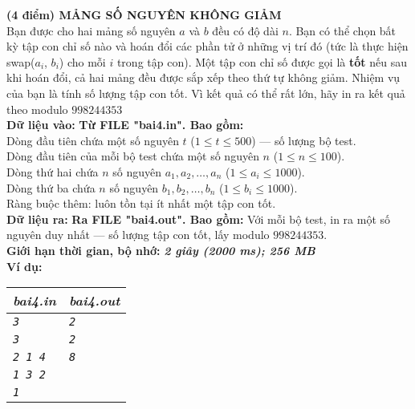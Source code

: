 \begin{ex}
	\textbf{(4 điểm) MẢNG SỐ NGUYÊN KHÔNG GIẢM}\\
	Bạn được cho hai mảng số nguyên $a$ và $b$ đều có độ dài $n$. Bạn có thể chọn bất kỳ tập con chỉ số nào và hoán đổi các phần tử ở những vị trí đó (tức là thực hiện swap($a_i$, $b_i$) cho mỗi $i$ trong tập con). Một tập con chỉ số được gọi là \textbf{tốt} nếu sau khi hoán đổi, cả hai mảng đều được sắp xếp theo thứ tự không giảm. Nhiệm vụ của bạn là tính số lượng tập con tốt. Vì kết quả có thể rất lớn, hãy in ra kết quả theo modulo $998244353$\\
	\textbf{Dữ liệu vào: } \textbf{Từ FILE "bai4.in". Bao gồm: }\\
	Dòng đầu tiên chứa một số nguyên $t$ ($1 \le t \le 500$) — số lượng bộ test. \\
	Dòng đầu tiên của mỗi bộ test chứa một số nguyên $n$ ($1 \le n \le 100$).\\
	Dòng thứ hai chứa $n$ số nguyên $a_1, a_2, \dots, a_n$ ($1 \le a_i \le 1000$). \\
	Dòng thứ ba chứa $n$ số nguyên $b_1, b_2, \dots, b_n$ ($1 \le b_i \le 1000$).\\
	Ràng buộc thêm: luôn tồn tại ít nhất một tập con tốt.\\
	\textbf{Dữ liệu ra: } \textbf{Ra FILE "bai4.out". Bao gồm: } Với mỗi bộ test, in ra một số nguyên duy nhất — số lượng tập con tốt, lấy modulo $998244353$. \\
	\textbf{Giới hạn thời gian, bộ nhớ: } \textbf{\textit{2 giây (2000 ms); 256 MB}} \\
	\textbf{Ví dụ: }
	\begin{center}
		\begin{tabular}{|l|l|}
			\hline
			\textbf{\textsf{\textit{bai4.in}}} & \textbf{\textsf{\textit{bai4.out}}} \\ %
			\hline
			\textit{\texttt{3}}                & \textit{\texttt{2}}                 \\ %
			\textit{\texttt{3}}                & \textit{\texttt{2}}                 \\ %
			\textit{\texttt{2 1 4}}            & \textit{\texttt{8}}                 \\ %
			\textit{\texttt{1 3 2}}            &                                     \\ %
			\textit{\texttt{1}}                &                                     \\

\end{tabular}
\end{center}
\end{ex}
